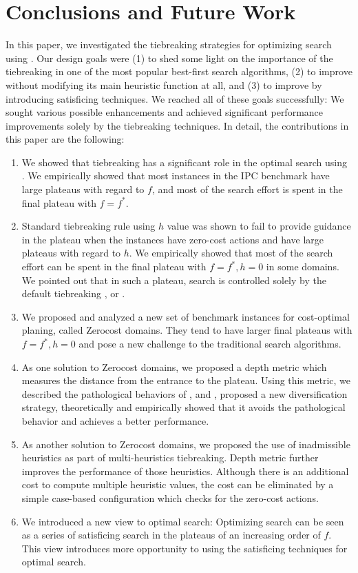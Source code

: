 
\section{Conclusions and Future Work}

In this paper, we investigated the tiebreaking strategies for optimizing search using \astar.  Our design goals
were (1) to shed some light on the importance of the tiebreaking in one of the most popular best-first search
algorithms, (2) to improve \astar without modifying its main heuristic function at all, and (3) to
improve \astar by introducing satisficing techniques. We reached all of these goals successfully: We sought
various possible enhancements and achieved significant performance improvements solely by the tiebreaking
techniques. In detail, the contributions in this paper are the following:

\begin{enumerate}
 \item We showed that tiebreaking has a significant role in the optimal
       search using \astar. We empirically showed that most instances in the IPC
       benchmark have large plateaus with regard to $f$, and most of the
       search effort is spent in the final plateau with $f=f^*$.
 \item Standard tiebreaking rule using $h$ value was shown to fail to
       provide guidance in the plateau when the instances have zero-cost
       actions and have large plateaus with regard to $h$.
       We empirically showed that most of the search effort can be spent in
       the final plateau with $f=f^*, h=0$ in some domains. We pointed out that in such
       a plateau, search is controlled solely by the
       default tiebreaking \fifo, \lifo or \ro.
 \item We proposed and analyzed a new set of benchmark instances for cost-optimal planing, called Zerocost domains.
       They tend to have larger final plateaus with $f=f^*, h=0$ and pose a new challenge to the traditional search
       algorithms.
 \item As one solution to Zerocost domains, we proposed a depth metric
       which measures the distance from the entrance to the
       plateau. Using this metric, we described the pathological
       behaviors of \fifo, \lifo and \ro, proposed a new diversification
       strategy, theoretically and empirically showed that it avoids the
       pathological behavior and achieves a better performance.
 \item As another solution to Zerocost domains, we proposed the use of
       inadmissible heuristics as part of multi-heuristics tiebreaking.
       Depth metric further improves the performance of those
       heuristics. Although there is an additional cost to compute
       multiple heuristic values, the cost can be eliminated by a simple
       case-based configuration which checks for the zero-cost actions.
 \item We introduced a new view to optimal \astar search: Optimizing search can be seen as a series of satisficing
       search in the plateaus of an increasing order of $f$. This view introduces more opportunity to using the
       satisficing techniques for optimal search.
\end{enumerate}

